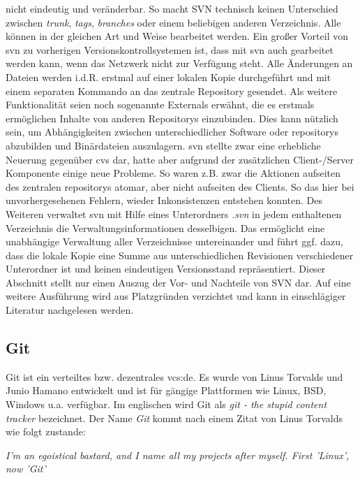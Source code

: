 nicht eindeutig und veränderbar.  So macht SVN technisch keinen Unterschied
zwischen \textit{trunk}, \textit{tags}, \textit{branches} oder einem beliebigen
anderen Verzeichnis. Alle können in der gleichen Art und Weise bearbeitet
werden. Ein großer Vorteil von \acrshort{svn} zu vorherigen
Versionskontrollsystemen ist, dass mit \acrshort{svn} auch gearbeitet werden
kann, wenn das Netzwerk nicht zur Verfügung steht. Alle Änderungen an Dateien
werden i.d.R. erstmal auf einer lokalen Kopie durchgeführt und mit einem
separaten Kommando an das zentrale Repository gesendet. Als weitere
Funktionalität seien noch sogenannte Externals erwähnt, die es erstmals
ermöglichen Inhalte von anderen Repositorys einzubinden. Dies kann nützlich
sein, um Abhängigkeiten zwischen unterschiedlicher Software oder
\glspl{repository} abzubilden und Binärdateien auszulagern. \acrshort{svn}
stellte zwar eine erhebliche Neuerung gegenüber \acrshort{cvs} dar, hatte aber
aufgrund der zusätzlichen Client-/Server Komponente einige neue Probleme. So
waren z.B. zwar die Aktionen aufseiten des zentralen \glspl{repository} atomar,
aber nicht aufseiten des Clients. So das hier bei unvorhergesehenen Fehlern,
wieder Inkonsistenzen entstehen konnten. Des Weiteren verwaltet \acrshort{svn}
mit Hilfe eines Unterordners \textit{.svn} in jedem enthaltenen Verzeichnis die
Verwaltungsinformationen desselbigen. Das ermöglicht eine unabhängige
Verwaltung aller Verzeichnisse untereinander und führt ggf. dazu, dass die
lokale Kopie eine Summe aus unterschiedlichen Revisionen verschiedener
Unterordner ist und keinen eindeutigen Versionsstand repräsentiert.  Dieser
Abschnitt stellt nur einen Auszug der Vor- und Nachteile von SVN dar. Auf
eine weitere Ausführung wird aus Platzgründen verzichtet und kann in
einschlägiger Literatur nachgelesen werden.\cite[S.~383-385]{cd}

\subsection{Git}\label{git}
Git ist ein verteiltes bzw. dezentrales \acrlong{vcs:de}. Es wurde von Linus
Torvalds und Junio Hamano entwickelt und ist für gängige Plattformen wie Linux,
BSD, Windows u.a. verfügbar. Im englischen wird Git als \textit{git - the
stupid content tracker} bezeichnet. Der Name \textit{Git} kommt nach einem
Zitat von Linus Torvalds wie folgt zustande\cite{link:gitfaq}:

\begin{center}
\textit{\glqq{}I'm an egoistical bastard, and I name all my projects after
myself. First 'Linux', now 'Git'\grqq{}}\\
\end{center}

